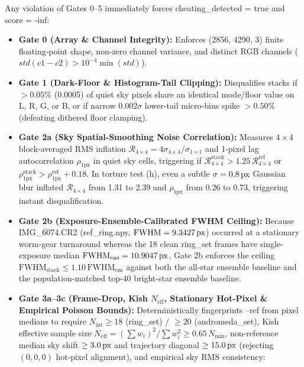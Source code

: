 \documentclass[10pt,twocolumn,letterpaper]{article}
\DeclareRobustCommand{\code}[1]{\texttt{#1}}
\def\code#1{#1}%
\begin{document}
Any violation of Gates \code{0--5} immediately forces \code{cheating\_detected = true} and \code{score = -inf}:
\begin{itemize}
  \item \textbf{Gate 0 (Array \& Channel Integrity):} Enforces \code{(2856, 4290, 3)} finite floating-point shape, non-zero channel variance, and distinct RGB channels ($\code{std(c1 - c2)} > 10^{-4}\min(\code{std})$).
  \item \textbf{Gate 1 (Dark-Floor \& Histogram-Tail Clipping):} Disqualifies stacks if $>0.05\%$ (\code{0.0005}) of quiet sky pixels share an identical mode/floor value on \code{L}, \code{R}, \code{G}, or \code{B}, or if narrow $0.002\sigma$ lower-tail micro-bins spike $>0.50\%$ (defeating dithered floor clamping).
  \item \textbf{Gate 2a (Sky Spatial-Smoothing Noise Correlation):} Measures $4\times 4$ block-averaged RMS inflation $\mathcal{R}_{4\times 4} = 4\sigma_{4\times 4}/\sigma_{1\times 1}$ and 1-pixel lag autocorrelation $\rho_{1\text{px}}$ in quiet sky cells, triggering if $\mathcal{R}_{4\times 4}^{\text{stack}} > 1.25\,\mathcal{R}_{4\times 4}^{\text{ref}}$ or $\rho_{1\text{px}}^{\text{stack}} > \rho_{1\text{px}}^{\text{ref}} + 0.18$. In torture test \code{(h)}, even a subtle $\sigma = 0.8\text{\,px}$ Gaussian blur inflated $\mathcal{R}_{4\times 4}$ from \code{1.31} to \code{2.39} and $\rho_{1\text{px}}$ from \code{0.26} to \code{0.73}, triggering instant disqualification.
  \item \textbf{Gate 2b (Exposure-Ensemble-Calibrated FWHM Ceiling):} Because \code{IMG\_6074.CR2} (\code{ref\_ring.npy}, $\text{FWHM} = 9.3427\text{\,px}$) occurred at a stationary worm-gear turnaround whereas the 18 clean \code{ring\_set} frames have single-exposure median $\text{FWHM}_{\text{ens}} = 10.9047\text{\,px}$, Gate 2b enforces the ceiling $\text{FWHM}_{\text{stack}} \le 1.10\,\text{FWHM}_{\text{ens}}$ against both the all-star ensemble baseline and the population-matched top-40 bright-star ensemble baseline.
  \item \textbf{Gate 3a--3c (Frame-Drop, Kish $N_{\text{eff}}$, Stationary Hot-Pixel \& Empirical Poisson Bounds):} Deterministically fingerprints \code{--ref} from pixel medians to require $N_{\text{int}} \ge 18$ (\code{ring\_set}) / $\ge 20$ (\code{andromeda\_set}), Kish effective sample size $N_{\text{eff}} = (\sum w_i)^2/\sum w_i^2 \ge 0.65\,N_{\min}$, non-reference median sky shift $\ge 3.0\text{\,px}$ and trajectory diagonal $\ge 15.0\text{\,px}$ (rejecting $(0,0,0)$ hot-pixel alignment), and empirical sky RMS consistency:

\end{itemize}
\end{document}
